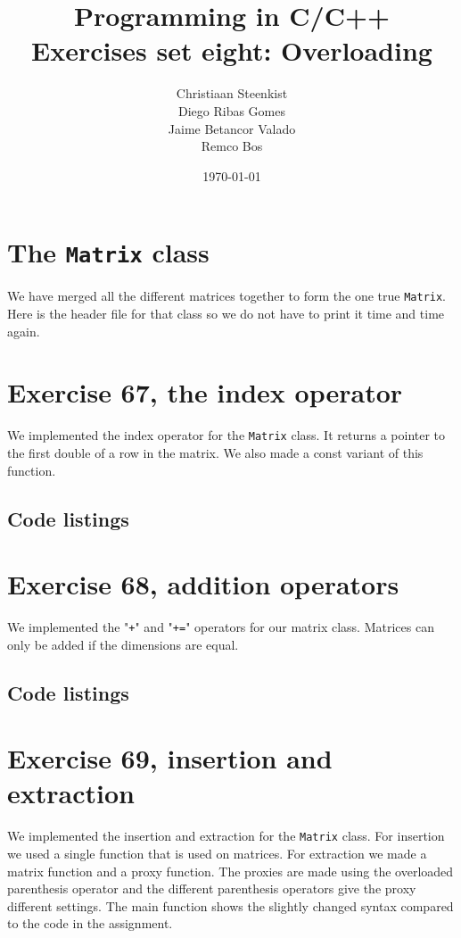 \documentclass[11pt]{article}
\begin{document}
\title{Programming in C/C++ \\
       Exercises set eight: Overloading
}
\date{\today}
\author{Christiaan Steenkist \\
Diego Ribas Gomes \\
Jaime Betancor Valado \\
Remco Bos \\
}

\maketitle

\section*{The \texttt{Matrix} class}
We have merged all the different matrices together to form the one true \texttt{Matrix}.
Here is the header file for that class so we do not have to print it time and time again.



\section*{Exercise 67, the index operator}
We implemented the index operator for the \texttt{Matrix} class.
It returns a pointer to the first double of a row in the matrix.
We also made a const variant of this function.

\subsection*{Code listings}

\section*{Exercise 68, addition operators}
We implemented the "\texttt{+}" and "\texttt{+=}" operators for our matrix class.
Matrices can only be added if the dimensions are equal.

\subsection*{Code listings}

\section*{Exercise 69, insertion and extraction}
We implemented the insertion and extraction for the \texttt{Matrix} class.
For insertion we used a single function that is used on matrices.
For extraction we made a matrix function and a proxy function.
The proxies are made using the overloaded parenthesis operator and the different parenthesis operators give the proxy different settings.
The main function shows the slightly changed syntax compared to the code in the assignment.
\end{document}
